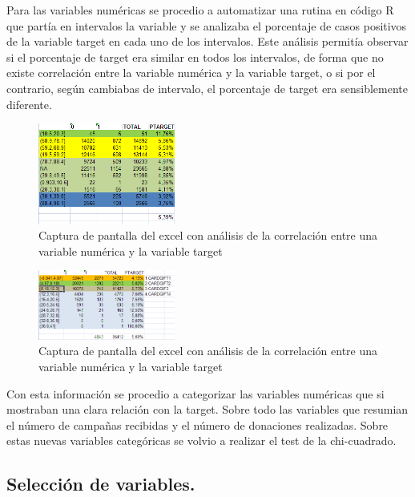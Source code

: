 Para las variables numéricas se procedio a automatizar una rutina en código R que partía en intervalos la variable y se analizaba el porcentaje de casos positivos de la variable target en cada uno de los intervalos. Este análisis permitía observar si el porcentaje de target era similar en todos los intervalos, de forma que no existe correlación entre la variable numérica y la variable target, o si por el contrario, según cambiabas de intervalo, el porcentaje de target era sensiblemente diferente.

\begin{figure}[H]
\begin{center}
\includegraphics[width=0.4\textwidth]{img/cuantitativa1}
\caption{Captura de pantalla del excel con análisis de la correlación entre una variable numérica y la variable target}
\end{center}
\end{figure}

\begin{figure}[H]
\begin{center}
\includegraphics[width=0.4\textwidth]{img/cuantitativa2}
\caption{Captura de pantalla del excel con análisis de la correlación entre una variable numérica y la variable target}
\end{center}
\end{figure}

Con esta información se procedio a categorizar las variables numéricas que si mostraban una clara relación con la target. Sobre todo las variables que resumian el número de campañas recibidas y el número de donaciones realizadas. Sobre estas nuevas variables categóricas se volvio a realizar el test de la chi-cuadrado.

\subsection{Selección de variables.}

